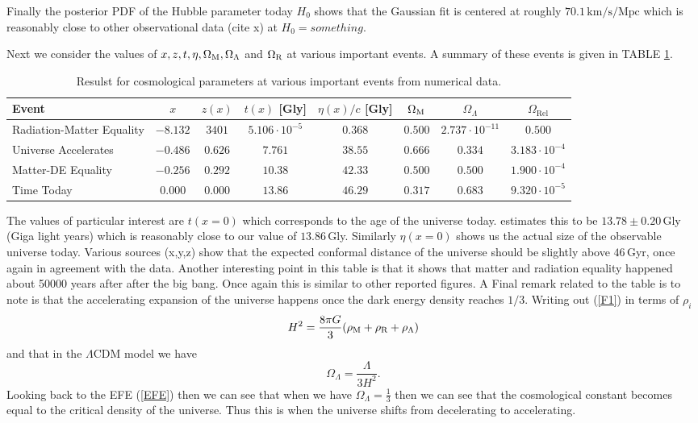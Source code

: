 \documentclass[%
reprint,
 amsmath,amssymb,
 aps,
]{revtex4-2}
\begin{document}
Finally the posterior PDF of the Hubble parameter today $H_0$ shows that the Gaussian fit is centered at roughly $70.1\,\text{km/s/Mpc}$ which is reasonably close to other observational data (cite x) at $H_0=something$.

Next we consider the values of $x,z,t,\eta,\Omega_\text M, \Omega_\Lambda$ and $\Omega_\text R$ at various important events. A summary of these events is given in TABLE \ref{tab:cosmo_events}.
\renewcommand{\arraystretch}{1.25}
\begin{table} %
	\caption{Resulst for cosmological parameters at various important events from numerical data.}
	\begin{tabular}{|l|c|c|c|c|c|c|c|}
		\hline
		Event & $x$ & $z(x)$ & $t(x)$ [Gly] & $\eta(x)/c$ [Gly] & $\Omega_\text M$ & $\Omega_{\Lambda}$ & $\Omega_{\text{Rel}}$ \\
		\hline
		Radiation-Matter Equality  & $-8.132$ & $3401$ & $5.106 \cdot 10^{-5}$ & $0.368$ & $0.500$ & $2.737 \cdot 10^{-11}$ & $0.500$ \\
		\hline
		Universe Accelerates & $-0.486$ & $0.626$ & $7.761$ & $38.55$ & $0.666$ & $0.334$ & $3.183\cdot10^{-4}$ \\
		\hline
		Matter-DE Equality & $-0.256$ & $0.292$ & $10.38$ & $42.33$ & $0.500$ & $0.500$ & $1.900\cdot10^{-4}$ \\
		\hline
		Time Today & $0.000 $ & $0.000 $ & $13.86$ & $46.29$ & $0.317$ & $0.683$ & $9.320 \cdot 10^{-5}$ \\
		\hline
	\end{tabular}
	\label{tab:cosmo_events}
\end{table}

The values of particular interest are $t(x=0)$ which corresponds to the age of the universe today. \cite{1} estimates this to be $13.78\pm0.20\,$Gly (Giga light years) which is reasonably close to our value of $13.86\,$Gly. Similarly $\eta(x=0)$ shows us the actual size of the observable universe today. Various sources (x,y,z) show that the expected conformal distance of the universe should be slightly above $46\,$Gyr, once again in agreement with the data. Another interesting point in this table is that it shows that matter and radiation equality happened about 50000 years after after the big bang. Once again this is similar to other reported figures. A Final remark related to the table is to note is that the accelerating expansion of the universe happens once the dark energy density reaches $1/3$. Writing out (\ref{F1}) in terms of $\rho_i$
\[H^2=\frac{8\pi G}{3}(\rho_\text M+\rho_\text{R}+\rho_\Lambda)\]
and that in the $\Lambda$CDM model we have
\[\Omega_\Lambda=\frac{\Lambda}{3H^2}.\]
Looking back to the EFE (\ref{EFE}) then we can see that when we have $\Omega_\Lambda=\frac13$ then we can see that the cosmological constant becomes equal to the critical density of the universe. Thus this is when the universe shifts from decelerating to accelerating.
\end{document}
